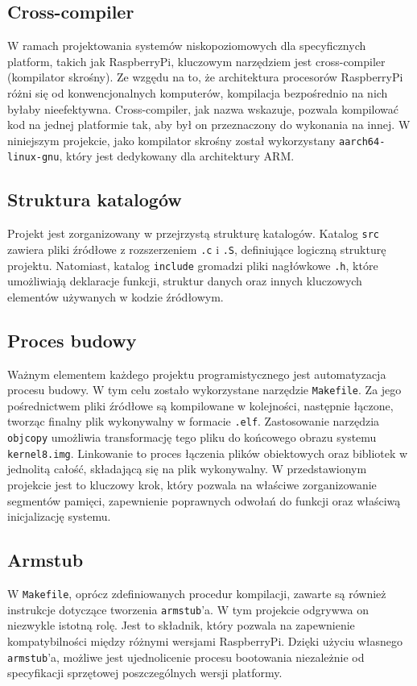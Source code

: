 \documentclass[shortabstract]{iithesis}
\begin{document}
\subsection{Cross-compiler}
W ramach projektowania systemów niskopoziomowych dla specyficznych platform, takich jak RaspberryPi, kluczowym narzędziem jest cross-compiler (kompilator skrośny). Ze wzgędu na to, że architektura procesorów RaspberryPi różni się od konwencjonalnych komputerów, kompilacja bezpośrednio na nich byłaby nieefektywna. Cross-compiler, jak nazwa wskazuje, pozwala kompilować kod na jednej platformie tak, aby był on przeznaczony do wykonania na innej. W niniejszym projekcie, jako kompilator skrośny został wykorzystany \texttt{aarch64-linux-gnu}, który jest dedykowany dla architektury ARM.
\subsection{Struktura katalogów}
Projekt jest zorganizowany w przejrzystą strukturę katalogów. Katalog \texttt{src} zawiera pliki źródłowe z rozszerzeniem \texttt{.c} i \texttt{.S}, definiujące logiczną strukturę projektu. Natomiast, katalog \texttt{include} gromadzi pliki nagłówkowe \texttt{.h}, które umożliwiają deklaracje funkcji, struktur danych oraz innych kluczowych elementów używanych w kodzie źródłowym.
\subsection{Proces budowy}
Ważnym elementem każdego projektu programistycznego jest automatyzacja procesu budowy. W tym celu zostało wykorzystane narzędzie \texttt{Makefile}. Za jego pośrednictwem pliki źródłowe są kompilowane w kolejności, następnie łączone, tworząc finalny plik wykonywalny w formacie \texttt{.elf}. Zastosowanie narzędzia \texttt{objcopy} umożliwia transformację tego pliku do końcowego obrazu systemu \texttt{kernel8.img}.
Linkowanie to proces łączenia plików obiektowych oraz bibliotek w jednolitą całość, składającą się na plik wykonywalny. W przedstawionym projekcie jest to kluczowy krok, który pozwala na właściwe zorganizowanie segmentów pamięci, zapewnienie poprawnych odwołań do funkcji oraz właściwą inicjalizację systemu.
\subsection{Armstub}
W \texttt{Makefile}, oprócz zdefiniowanych procedur kompilacji, zawarte są również instrukcje dotyczące tworzenia \texttt{armstub}'a. W tym projekcie odgrywwa on niezwykle istotną rolę. Jest to składnik, który pozwala na zapewnienie kompatybilności między różnymi wersjami RaspberryPi. Dzięki użyciu własnego \texttt{armstub}'a, możliwe jest ujednolicenie procesu bootowania niezależnie od specyfikacji sprzętowej poszczególnych wersji platformy.
\end{document}
